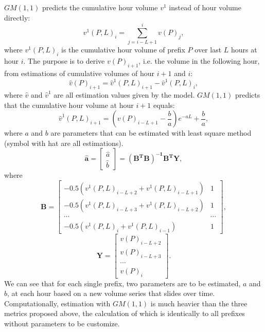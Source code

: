 $GM(1,1)$ predicts the cumulative hour volume $v^1$ instead of hour volume directly:
\begin{equation*}
v^1(P,L)_{i} = \displaystyle \sum_{j=i-L+1}^{i} v(P)_j,
\end{equation*}
where $v^1(P,L)_{i}$ is the cumulative hour volume of prefix $P$ over last $L$ hours at hour $i$. The purpose is to derive $v(P)_{i+1}$, i.e. the volume in the following hour, from estimations of cumulative volumes of hour $i+1$ and $i$:
\begin{equation*}
\hat{v}(P)_{i+1} = \hat{v}^1(P,L)_{i+1} - \hat{v}^1(P,L)_{i},
\end{equation*}
where $\hat v$ and $\hat v ^1$ are all estimation values given by the model.
$GM(1,1)$ predicts that the cumulative hour volume at hour $i+1$ equals:
\begin{equation*}
\hat v ^1 (P,L)_{i+1} = (v(P)_{i-L+1} - \frac{b}{a}) e^{-aL} + \frac{b}{a},
\end{equation*}
where $a$ and $b$ are parameters that can be estimated with least square method (symbol with hat are all estimations).
\begin{equation*}
\mathbf{\hat a} = \begin{bmatrix}
\hat a \\ \hat b
\end{bmatrix} = \mathbf{(B^TB)^{-1}B^T Y},
\end{equation*}
where
\begin{equation*}
\mathbf{B} = \begin{bmatrix}
-0.5(v^1(P,L)_{i-L+2} + v^1(P,L)_{i-L+1}) & 1\\
-0.5(v^1(P,L)_{i-L+3} + v^1(P,L)_{i-L+2}) & 1\\
\cdots & \cdots \\
-0.5(v^1(P,L)_i + v^1(P,L)_{i-1}) & 1
\end{bmatrix},
\end{equation*}
\begin{equation*}
\mathbf{Y} = \begin{bmatrix}
v(P)_{i-L+2}\\
v(P)_{i-L+3}\\
\cdots\\
v(P)_i
\end{bmatrix}.
\end{equation*}
We can see that for each single prefix, two parameters are to be estimated, $a$ and $b$, at each hour based on a new volume series that slides over time. Computationally, estimation with $GM(1,1)$ is much heavier than the three metrics proposed above, the calculation of which is identically to all prefixes without parameters to be customize.

